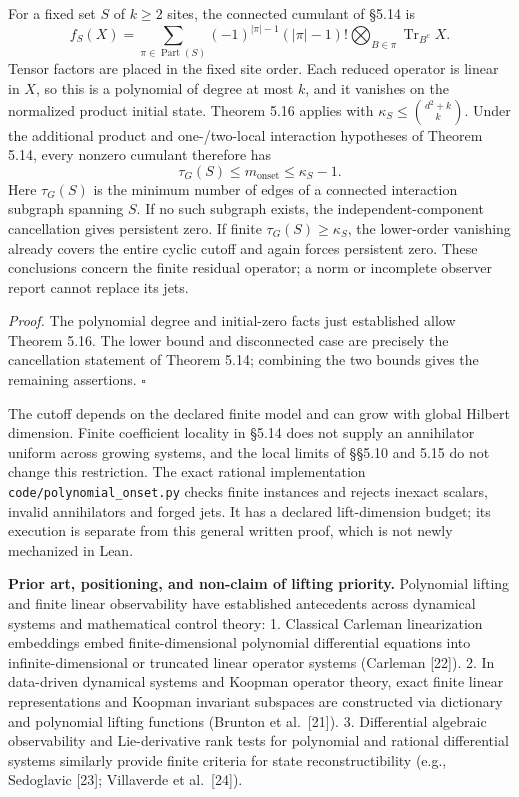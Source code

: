\documentclass[
  11pt,
]{article}
\begin{document}
For a fixed set \(S\) of \(k\geq2\) sites, the connected cumulant of §5.14 is
\[
 f_S(X)=\sum_{\pi\in\operatorname{Part}(S)}
          (-1)^{|\pi|-1}(|\pi|-1)!
          \bigotimes_{B\in\pi}\operatorname{Tr}_{B^c}X.
\]
Tensor factors are placed in the fixed site order. Each reduced operator is
linear in \(X\), so this is a polynomial of degree at most \(k\), and it vanishes
on the normalized product initial state. Theorem 5.16 applies with
\(\kappa_S\leq {d^2+k\choose k}\). Under the additional product and one-/two-local
interaction hypotheses of Theorem 5.14, every nonzero cumulant therefore has
\[
 \boxed{\quad \tau_G(S)\leq m_{\mathrm{onset}}
                         \leq\kappa_S-1.\quad}
\]
Here \(\tau_G(S)\) is the minimum number of edges of a connected interaction
subgraph spanning \(S\). If no such subgraph exists, the independent-component
cancellation gives persistent zero. If finite \(\tau_G(S)\geq\kappa_S\), the
lower-order vanishing already covers the entire cyclic cutoff and again
forces persistent zero. These conclusions concern the finite residual
operator; a norm or incomplete observer report cannot replace its jets.

\emph{Proof.} The polynomial degree and initial-zero facts just established allow
Theorem 5.16. The lower bound and disconnected case are precisely the
cancellation statement of Theorem 5.14; combining the two bounds gives the
remaining assertions. \(\square\)

The cutoff depends on the declared finite model and can grow with global
Hilbert dimension. Finite coefficient locality in §5.14 does not supply an
annihilator uniform across growing systems, and the local limits of §§5.10
and 5.15 do not change this restriction. The exact rational implementation
\texttt{code/polynomial\_onset.py} checks finite instances and rejects inexact scalars,
invalid annihilators and forged jets. It has a declared lift-dimension budget;
its execution is separate from this general written proof, which is not newly
mechanized in Lean.

\textbf{Prior art, positioning, and non-claim of lifting priority.} Polynomial lifting
and finite linear observability have established antecedents across dynamical systems
and mathematical control theory:
1. Classical Carleman linearization embeddings embed finite-dimensional polynomial
differential equations into infinite-dimensional or truncated linear operator
systems (Carleman {[}22{]}).
2. In data-driven dynamical systems and Koopman operator theory, exact finite linear
representations and Koopman invariant subspaces are constructed via dictionary
and polynomial lifting functions (Brunton et al.~{[}21{]}).
3. Differential algebraic observability and Lie-derivative rank tests for polynomial
and rational differential systems similarly provide finite criteria for state
reconstructibility (e.g., Sedoglavic {[}23{]}; Villaverde et al.~{[}24{]}).
\end{document}

